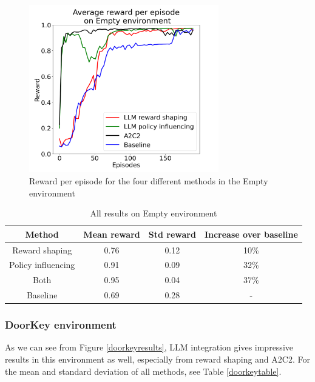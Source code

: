 \documentclass[conference]{IEEEtran}
\begin{document}
\begin{figure}[h]
\centerline{\includegraphics[width=3.25in]{figure/emptyresults.png}}
\caption{Reward per episode for the four different methods in the Empty environment}
\label{emptyresults}
\end{figure}

\begin{table}[h]
\caption{All results on Empty environment}
\begin{center}
\label{emptytable}
\begin{tabular}{c | c c c}
Method & Mean reward & Std reward & Increase over baseline \\
\hline
Reward shaping & 0.76 & 0.12 & 10\% \\
Policy influencing & 0.91 & 0.09 & 32\% \\
Both & 0.95 & 0.04 & 37\% \\
Baseline & 0.69 & 0.28 & - \\
\end{tabular}
\end{center}
\end{table}


\subsubsection{DoorKey environment}

As we can see from Figure \ref{doorkeyresults}, LLM integration gives impressive results in this environment as well, especially from reward shaping and A2C2. For the mean and standard deviation of all methods, see Table \ref{doorkeytable}.
\end{document}
